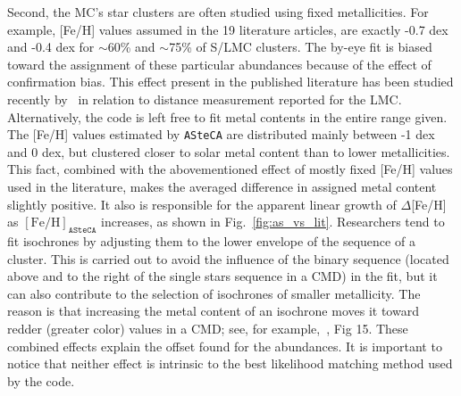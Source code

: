 \documentclass[draft]{aa}
\begin{document}
\noindent Second, the MC's star clusters are often studied
using fixed metallicities. For example, [Fe/H] values assumed in the 19
literature articles, are exactly -0.7 dex and -0.4 dex for $\sim$60\% and
$\sim$75\% of S/LMC clusters. The by-eye fit is biased toward the
assignment of these particular abundances because of the effect
of confirmation bias. This effect present in the published
literature has been studied recently by~\cite{de_Grijs_2014} in relation to
distance measurement reported for the LMC.\@
Alternatively, the code is left free to fit metal contents in the
entire range given. The [Fe/H] values estimated by \texttt{ASteCA} are
distributed mainly between -1 dex and 0 dex, but clustered closer to solar
metal content than to lower metallicities. This fact, combined with the
abovementioned effect of mostly fixed [Fe/H] values used in the literature,
makes the averaged difference in assigned metal content slightly positive.
It also is responsible for the apparent linear growth of $\Delta$[Fe/H] as
$\mathrm{[Fe/H]}_{\mathtt{ASteCA}}$ increases, as shown in Fig.~\ref{fig:as_vs_lit}.
%
Researchers tend to fit isochrones by adjusting them to the lower envelope of
the sequence of a cluster. This is carried out to avoid the influence of the
binary sequence (located above and to the right of the single stars sequence in
a CMD) in the fit, but it can also contribute to the selection of
isochrones of smaller metallicity. The reason is that increasing the
metal content of an isochrone moves it toward redder (greater color) values in a
CMD; see, for example,~\cite{Bressan_2012}, Fig 15.
%
These combined effects explain the offset found for the abundances. It is
important to notice that neither effect is intrinsic to the best likelihood
matching method used by the code.
\end{document}
